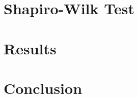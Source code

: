 \documentclass{article}
\begin{document}
\section{Shapiro-Wilk Test}

\section{Results}
\section{Conclusion}
\end{document}
